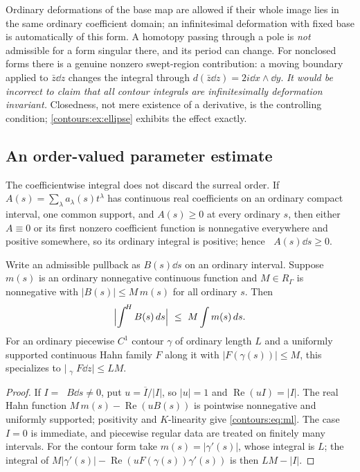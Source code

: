 \documentclass[11pt,letterpaper]{article}
\theoremstyle{definition}
\theoremstyle{remark}
\newcommand{\re}{\operatorname{Re}}
\newcommand{\HInt}{\mathop{\int^{\!H}}\nolimits}
\numberwithin{equation}{section}
\begin{document}
Ordinary deformations of the base map are allowed if their whole image lies in the
same ordinary coefficient domain; an infinitesimal deformation with fixed base is
automatically of this form. A homotopy passing through a pole is \emph{not}
admissible for a form singular there, and its period can change. For nonclosed forms
there is a genuine nonzero swept-region contribution: a moving boundary applied to
$\bar z\dd z$ changes the integral through
$d(\bar z\dd z)=2i\dd x\wedge \dd y$. \emph{It would be incorrect to claim that all
contour integrals are infinitesimally deformation invariant.} Closedness, not mere
existence of a derivative, is the controlling condition; \cref{contours:ex:ellipse}
exhibits the effect exactly.

\subsection{An order-valued parameter estimate}
The coefficientwise integral does not discard the surreal order. If
$A(s)=\sum_\lambda a_\lambda(s)t^\lambda$ has continuous real coefficients on an
ordinary compact interval, one common support, and $A(s)\ge0$ at every ordinary $s$,
then either $A\equiv0$ or its first nonzero coefficient function is nonnegative
everywhere and positive somewhere, so its ordinary integral is positive; hence
$\HInt A(s)\dd s\ge0$.

\begin{proposition}\label{contours:prop:ml}
Write an admissible pullback as $B(s)\dd s$ on an ordinary interval. Suppose $m(s)$
is an ordinary nonnegative continuous function and $M\in R_\Gamma$ is nonnegative
with $|B(s)|\le M\,m(s)$ for all ordinary $s$. Then
\begin{equation}\label{contours:eq:ml}
  \Bigl|\HInt B(s)\dd s\Bigr|\ \le\ M\int m(s)\dd s .
\end{equation}
For an ordinary piecewise $C^1$ contour $\gamma$ of ordinary length $L$ and a
uniformly supported continuous Hahn family $F$ along it with $|F(\gamma(s))|\le M$,
this specializes to $\bigl|\HInt_\gamma F\dd z\bigr|\le LM$.
\end{proposition}
\begin{proof}
If $I=\HInt B\dd s\ne0$, put $u=\overline I/|I|$, so $|u|=1$ and $\re(uI)=|I|$. The
real Hahn function $M\,m(s)-\re(uB(s))$ is pointwise nonnegative and uniformly
supported; positivity and $K$-linearity give \eqref{contours:eq:ml}. The case $I=0$
is immediate, and piecewise regular data are treated on finitely many intervals. For
the contour form take $m(s)=|\gamma'(s)|$, whose integral is $L$; the integral of
$M|\gamma'(s)|-\re(uF(\gamma(s))\gamma'(s))$ is then $LM-|I|$.
\end{proof}
\end{document}
